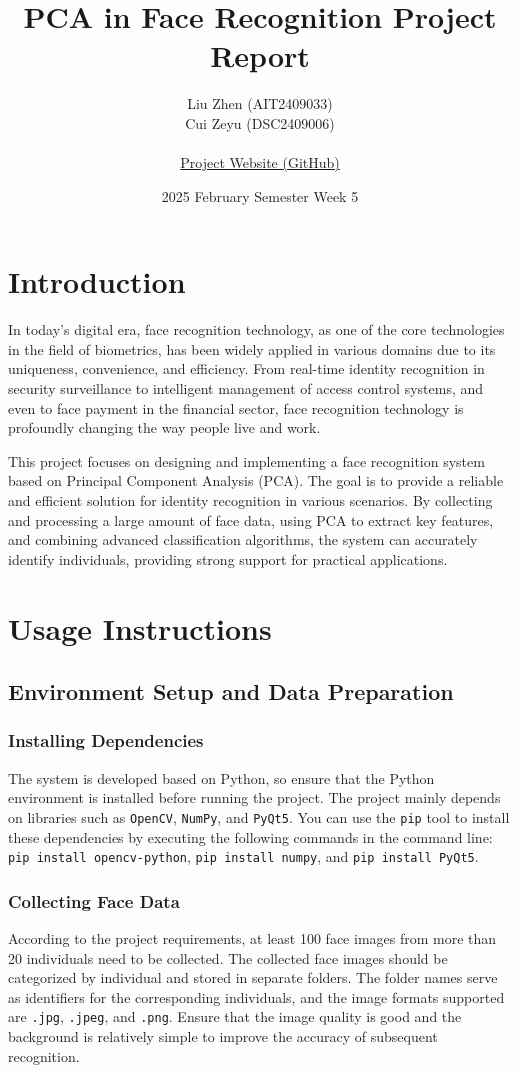 \documentclass{article}
\title{PCA in Face Recognition Project Report}
\date{2025 February Semester Week 5}
\author{
    Liu Zhen (AIT2409033) \\
    Cui Zeyu (DSC2409006) \\ \\
    \href{https://github.com/zeyu10/FaceRecognition}{Project Website (GitHub)}
}
\begin{document}
\maketitle

\tableofcontents
\newpage

\section{Introduction}
In today's digital era, face recognition technology, as one of the core technologies in the field of biometrics, has been widely applied in various domains due to its uniqueness, convenience, and efficiency. From real-time identity recognition in security surveillance to intelligent management of access control systems, and even to face payment in the financial sector, face recognition technology is profoundly changing the way people live and work.

This project focuses on designing and implementing a face recognition system based on Principal Component Analysis (PCA). The goal is to provide a reliable and efficient solution for identity recognition in various scenarios. By collecting and processing a large amount of face data, using PCA to extract key features, and combining advanced classification algorithms, the system can accurately identify individuals, providing strong support for practical applications.
\newpage
\section{Usage Instructions}

\subsection{Environment Setup and Data Preparation}

\subsubsection{Installing Dependencies}
The system is developed based on Python, so ensure that the Python environment is installed before running the project. The project mainly depends on libraries such as \texttt{OpenCV}, \texttt{NumPy}, and \texttt{PyQt5}. You can use the \texttt{pip} tool to install these dependencies by executing the following commands in the command line: \texttt{pip install opencv-python}, \texttt{pip install numpy}, and \texttt{pip install PyQt5}.

\subsubsection{Collecting Face Data}
According to the project requirements, at least 100 face images from more than 20 individuals need to be collected. The collected face images should be categorized by individual and stored in separate folders. The folder names serve as identifiers for the corresponding individuals, and the image formats supported are \texttt{.jpg}, \texttt{.jpeg}, and \texttt{.png}. Ensure that the image quality is good and the background is relatively simple to improve the accuracy of subsequent recognition.
\end{document}
